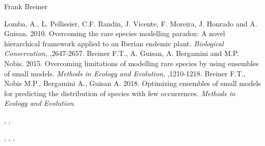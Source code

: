 \documentclass[a4paper]{book}
\begin{document}
%
\begin{Author}\relax
Frank Breiner 

\end{Author}
%
\begin{References}\relax

Lomba, A., L. Pellissier, C.F. Randin, J. Vicente, F. Moreira, J. Honrado and A. Guisan. 2010. Overcoming the rare species modelling paradox: A novel hierarchical framework applied to an Iberian endemic plant. \emph{Biological Conservation}, ,2647-2657.
Breiner F.T., A. Guisan, A. Bergamini and M.P. Nobis. 2015. Overcoming limitations of modelling rare species by using ensembles of small models. \emph{Methods in Ecology and Evolution}, ,1210-1218.
Breiner F.T., Nobis M.P., Bergamini A., Guisan A. 2018. Optimizing ensembles of small models for predicting the distribution of species with few occurrences. \emph{Methods in Ecology and Evolution}. 
\end{References}
%
\begin{SeeAlso}\relax
{}, , 

, , , 

\end{SeeAlso}
%
\end{document}
